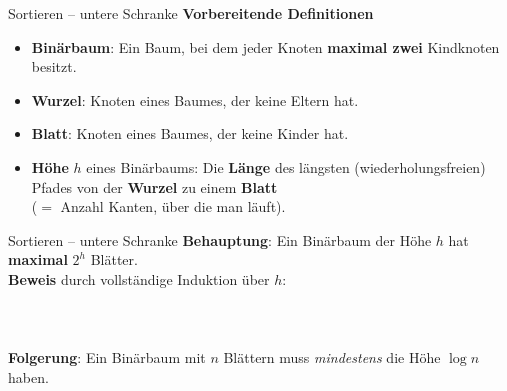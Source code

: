 \begin{frame}{Sortieren – untere Schranke}
	\textbf{Vorbereitende Definitionen}
	\pause
	\begin{itemize}
		\item \textbf{Binärbaum}: Ein Baum, bei dem jeder Knoten \textbf{maximal zwei} Kindknoten besitzt. 
		\pause
		\item \textbf{Wurzel}: Knoten eines Baumes, der keine Eltern hat.
		\item \textbf{Blatt}: Knoten eines Baumes, der keine Kinder hat.
		\pause
		\item \textbf{Höhe} $h$ eines Binärbaums: Die \textbf{Länge} des längsten (wiederholungsfreien) Pfades von der \textbf{Wurzel} zu einem \textbf{Blatt} \\ {\small ($=$ Anzahl Kanten, über die man läuft)}.
	\end{itemize}
\end{frame}

\begin{frame}{Sortieren – untere Schranke}
	\textbf{Behauptung}: Ein Binärbaum der Höhe $h$ hat \textbf{maximal} $2^h$  Blätter. \\
	\pause
	\textbf{Beweis} durch vollständige Induktion über $h$: \\
	\pause
	 \\
	\pause
	 \\
	\pause
	 \\
	\pause
	\impl \textbf{Folgerung}: Ein Binärbaum mit $n$ Blättern muss \textit{mindestens} die Höhe $\log n$ haben.
\end{frame}

